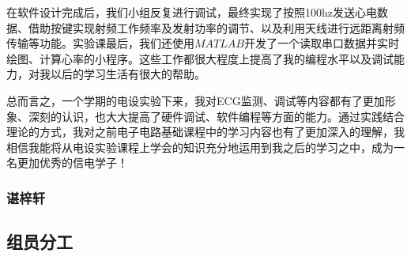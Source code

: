 \documentclass{zjureport}
\begin{document}
	在软件设计完成后，我们小组反复进行调试，最终实现了按照100hz发送心电数据、借助按键实现射频工作频率及发射功率的调节、以及利用天线进行远距离射频传输等功能。实验课最后，我们还使用$MATLAB$开发了一个读取串口数据并实时绘图、计算心率的小程序。这些工作都很大程度上提高了我的编程水平以及调试能力，对我以后的学习生活有很大的帮助。
	
	总而言之，一个学期的电设实验下来，我对ECG监测、调试等内容都有了更加形象、深刻的认识，也大大提高了硬件调试、软件编程等方面的能力。通过实践结合理论的方式，我对之前电子电路基础课程中的学习内容也有了更加深入的理解，我相信我能将从电设实验课程上学会的知识充分地运用到我之后的学习之中，成为一名更加优秀的信电学子！
	
	\subsubsection{谌梓轩}
	
	\subsection{组员分工}
	
	
	
\end{document}
